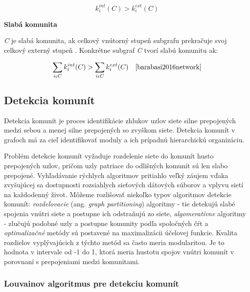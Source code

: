\documentclass[slovak,master,public,dept460,male,cpdeclaration,oneside]{diploma}
\begin{document}
\begin{equation}
    {k_{i}^{int}(C) > k_{i}^{ext}(C)}
    \label{equation_silna_komunita}
\end{equation}



\newpage

\noindent\textbf{Slabá komunita}


\textit{C} je slabá komunita, ak celkový vnútorný stupeň subgrafu prekračuje svoj celkový externý stupeň \cite{radicchi2004defining}. Konkrétne subgraf \textit{C} tvorí slabú komunitu ak:



\begin{equation}
    {\sum_{i \epsilon C} k_{i}^{int} (C) > \sum_{i \epsilon C} k_{i}^{ext} (C)\quad}
    \label{equation_slaba_komunita}
    \cite{barabasi2016network}
\end{equation}
   



\subsection{Detekcia komunít}
Detekcia komunít je proces identifikácie zhlukov uzlov siete silne prepojených medzi sebou a menej silne prepojených so zvyškom siete. Detekcia komunít v grafoch má za cieľ identifikovať moduly a ich prípadnú hierarchickú organizáciu.


Problém detekcie komunít vyžaduje  rozdelenie siete do komunít husto prepojených uzlov, pričom uzly patriace do odlišných komunít sú len slabo prepojené. Vyhľadávanie rýchlych algoritmov pritiahlo veľký záujem vďaka zvyšujúcej sa dostupnosti rozsiahlych sieťových dátových súborov a vplyvu sietí na každodenný život. Môžeme rozlišovať niekoľko typov algoritmov detekcie komunít: \textit{rozdeľovacie} (ang. \textit{graph partitioning}) algoritmy - tie detekujú slabé spojenia vnútri siete a postupne ich odstraňujú zo siete, \textit{algomeratívne} algoritmy - zlučujú podobné uzly a postupne komunity podľa spoločných čŕt a \textit{optimalizačné} metódy sú postavené na maximalizácii účelovej funkcie. Kvalita rozdielov vyplývajúcich z týchto metód sa často meria  modularitou. Je to hodnota v intervale od -1 do 1, ktorá meria hustotu spojov vnútri komunít v porovnaní s prepojeniami medzi komunitami. \cite{blondel2008fast}


\subsubsection{Louvainov algoritmus pre detekciu komunít}
\end{document}
